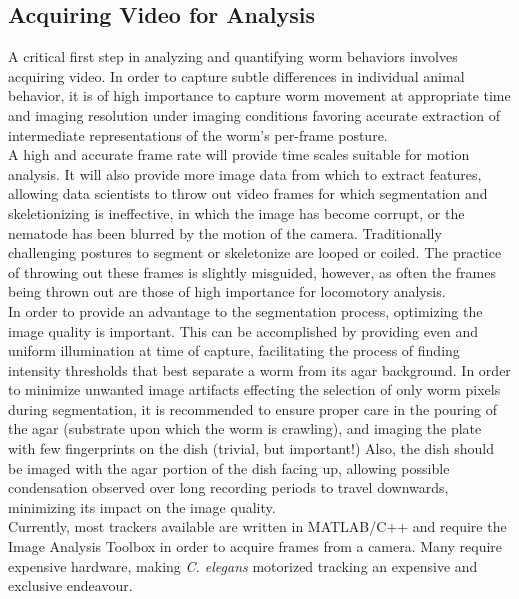\documentclass[main.tex]{subfiles}
\begin{document}
\subsection{Acquiring Video for Analysis}
A critical first step in analyzing and quantifying worm behaviors involves acquiring video. In order to capture subtle differences in individual animal behavior, it is of high importance to capture worm movement at appropriate time and imaging resolution under imaging conditions favoring accurate extraction of intermediate representations of the worm's per-frame posture. \\

A high and accurate frame rate will provide time scales suitable for motion analysis. It will also provide more image data from which to extract features, allowing data scientists to throw out video frames for which segmentation and skeletionizing is ineffective, in which the image has become corrupt, or the nematode has been blurred by the motion of the camera. Traditionally challenging postures to segment or skeletonize are looped or coiled. The practice of throwing out these frames is slightly misguided, however, as often the frames being thrown out are those of high importance for locomotory analysis.\\

In order to provide an advantage to the segmentation process, optimizing the image quality is important. This can be accomplished by providing even and uniform illumination at time of capture, facilitating the process of finding intensity thresholds that best separate a worm from its agar background. In order to minimize unwanted image artifacts effecting the selection of only worm pixels during segmentation, it is recommended to ensure proper care in the pouring of the agar (substrate upon which the worm is crawling), and imaging the plate with few fingerprints on the dish (trivial, but important!) Also, the dish should be imaged with the agar portion of the dish facing up, allowing possible condensation observed over long recording periods to travel downwards, minimizing its impact on the image quality.\\

Currently, most trackers available are written in MATLAB/C++ and require the Image Analysis Toolbox in order to acquire frames from a camera. Many require expensive hardware, making \textit{C. elegans} motorized tracking an expensive and exclusive endeavour.\\ 
\end{document}
